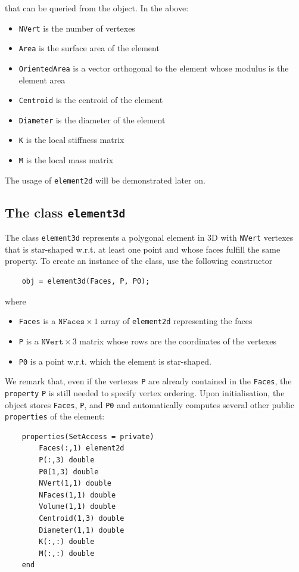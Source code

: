 \documentclass[a4paper]{article}
\begin{document}
\noindent
that can be queried from the object. In the above:
\begin{itemize}
\item \texttt{NVert} is the number of vertexes
\item \texttt{Area} is the surface area of the element
\item \texttt{OrientedArea} is a vector orthogonal to the element whose modulus is the element area
\item \texttt{Centroid} is the centroid of the element
\item \texttt{Diameter} is the diameter of the element
\item \texttt{K} is the local stiffness matrix
\item \texttt{M} is the local mass matrix
\end{itemize}

\noindent
The usage of \texttt{element2d} will be demonstrated later on.

\subsection{The class \texttt{element3d}}
The class \texttt{element3d} represents a polygonal element in 3D with \texttt{NVert} vertexes that is star-shaped w.r.t. at least one point and whose faces fulfill the same property.  To create an instance of the class, use the following constructor

\begin{lstlisting}
	obj = element3d(Faces, P, P0);
\end{lstlisting}
%
where 
\begin{itemize}
\item \texttt{Faces} is a $\texttt{NFaces} \times 1$ array of \texttt{element2d} representing the faces
\item \texttt{P} is a $\texttt{NVert} \times 3$ matrix whose rows are the coordinates of the vertexes
\item \texttt{P0} is a point w.r.t. which the element is star-shaped.
\end{itemize}
We remark that, even if the vertexes \texttt{P} are already contained in the \texttt{Faces}, the \texttt{property} \texttt{P} is still needed to specify vertex ordering. Upon initialisation, the object stores \texttt{Faces}, \texttt{P}, and \texttt{P0} and automatically computes several other public \texttt{properties} of the element:

\begin{lstlisting}
	properties(SetAccess = private)
		Faces(:,1) element2d
		P(:,3) double
		P0(1,3) double
		NVert(1,1) double
		NFaces(1,1) double
		Volume(1,1) double
		Centroid(1,3) double
		Diameter(1,1) double
		K(:,:) double
		M(:,:) double
	end
\end{lstlisting}
\end{document}
